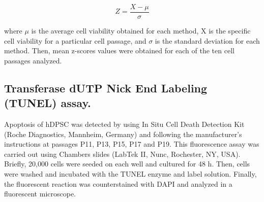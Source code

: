 \documentclass[a4paper,12pt]{article}
\begin{document}
$$Z=\frac{X-\mu}{\sigma}$$
 
where $\mu$ is the average cell viability obtained for each method, X is the specific cell viability for a particular cell passage, and $\sigma$ is the standard deviation for each method. Then, mean z-scores values were obtained for each of the ten cell passages analyzed.

\subsection{Transferase dUTP Nick End Labeling (TUNEL) assay.}
Apoptosis of hDPSC was detected by using In Situ Cell Death Detection Kit (Roche Diagnostics, Mannheim, Germany) and following the manufacturer's instructions at passages P11, P13, P15, P17 and P19. This fluorescence assay was carried out using Chambers slides (LabTek II, Nunc, Rochester, NY, USA). Briefly, 20,000 cells were seeded on each well and cultured for 48 h. Then, cells were washed and incubated with the TUNEL enzyme and label solution. Finally, the fluorescent reaction was counterstained with DAPI and analyzed in a fluorescent microscope.\\
\end{document}
